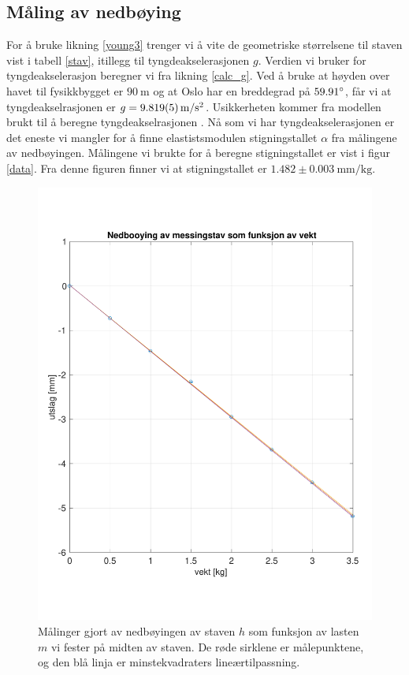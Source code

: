 \documentclass[%
 reprint,
 amsmath,amssymb,
 aps,
 norsk,
 booktabs
]{revtex4-1}
\begin{document}
\subsection{Måling av nedbøying}
For å bruke likning \eqref{young3} trenger vi å vite de geometriske størrelsene til staven vist i tabell \vref{stav}, itillegg til tyngdeakselerasjonen $g$. Verdien vi bruker for tyngdeakselerasjon beregner vi fra likning \eqref{calc_g}. Ved å bruke at høyden over havet til fysikkbygget er $\SI{90}{\meter}$ og at Oslo har en breddegrad på $59.91\degree$, får vi at tyngdeakselrasjonen er $g=\SI{9.819\pm0.005}{\meter\per\second^2}$. Usikkerheten kommer fra modellen brukt til å beregne tyngdeakselrasjonen \cite{gravity}.
Nå som vi har tyngdeakselerasjonen er det eneste vi mangler for å finne elastistsmodulen stigningstallet $\alpha$ fra målingene av nedbøyingen. Målingene vi brukte for å beregne stigningstallet er vist i figur \vref{data}. Fra denne figuren finner vi at stigningstallet er $1.482\pm\SI{0.003}{\milli\meter\per\kilo\gram}$.
\begin{figure}[h!]
  \centering
  \includegraphics[scale=0.4]{nedbojing.pdf}
  \caption{Målinger gjort av nedbøyingen av staven $h$ som funksjon av lasten $m$ vi fester på midten av staven. De røde sirklene er målepunktene, og den blå linja er minstekvadraters lineærtilpassning.}
  \label{data}
\end{figure}
\end{document}
